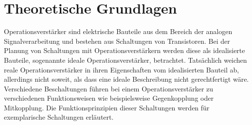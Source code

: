 \section{Theoretische Grundlagen}
Operationsverstärker sind elektrische Bauteile aus dem Bereich der analogen
Signalverarbeitung und bestehen aus Schaltungen von Transistoren. Bei der
Planung von Schaltungen mit Operationsverstärkern werden diese als idealisierte
Bauteile, sogenannte ideale Operationsverstärker, betrachtet. Tatsächlich
weichen reale Operationsverstärker in ihren Eigenschaften vom idealisierten
Bauteil ab, allerdings nicht soweit, als dass eine ideale Beschreibung nicht
gerechtfertigt wäre. \\
\noindent Verschiedene Beschaltungen führen bei einem Operationsverstärker zu
verschiedenen Funktionsweisen wie beispielsweise Gegenkopplung oder
Mitkopplung. Die Funktionsprinzipien dieser Schaltungen werden für exemplarische
Schaltungen erläutert.
